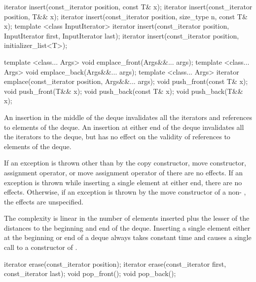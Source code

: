%
%
%
%
\begin{itemdecl}
iterator insert(const_iterator position, const T& x);
iterator insert(const_iterator position, T&& x);
iterator insert(const_iterator position, size_type n, const T& x);
template <class InputIterator>
  iterator insert(const_iterator position,
                  InputIterator first, InputIterator last);
iterator insert(const_iterator position, initializer_list<T>);

template <class... Args> void emplace_front(Args&&... args);
template <class... Args> void emplace_back(Args&&... args);
template <class... Args> iterator emplace(const_iterator position, Args&&... args);
void push_front(const T& x);
void push_front(T&& x);
void push_back(const T& x);
void push_back(T&& x);
\end{itemdecl}

\begin{itemdescr}
\pnum
\effects
An insertion in the middle of the deque invalidates all the iterators and
references to elements of the deque.
An insertion at either end of the
deque invalidates all the iterators to the deque, but has no effect on
the validity of references to elements of the deque.

\pnum
\remarks
If an exception is thrown other than by the
copy constructor, move constructor,
assignment operator, or move assignment operator of
there are no effects.
If an exception is thrown while inserting a single element at either end,
there are no effects.
Otherwise, if an exception is thrown by the move constructor of a
non-
, the effects are unspecified.

\pnum
\complexity
The complexity is linear in the number of elements inserted plus the lesser
of the distances to the beginning and end of the deque.
Inserting a single element either at the beginning or end of a deque always takes constant time
and causes a single call to a constructor of
.
\end{itemdescr}

%
\begin{itemdecl}
iterator erase(const_iterator position);
iterator erase(const_iterator first, const_iterator last);
void pop_front();
void pop_back();
\end{itemdecl}

